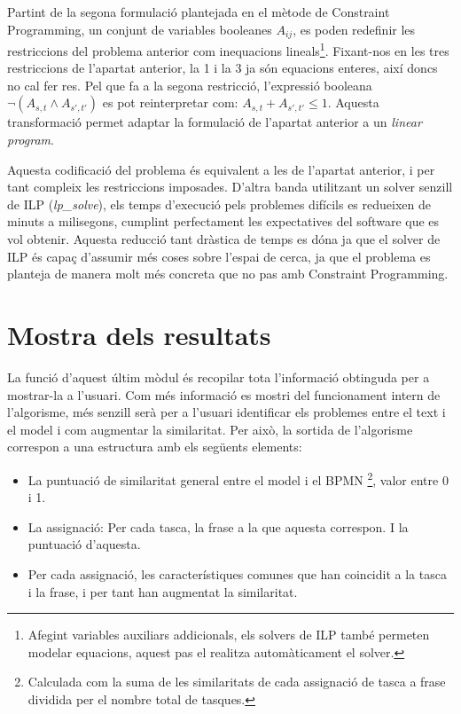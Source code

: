 Partint de la segona formulació plantejada en el mètode de Constraint Programming, un conjunt de variables booleanes $A_{ij}$, es poden redefinir les restriccions del problema anterior com inequacions lineals\footnote{Afegint variables auxiliars addicionals, els solvers de ILP també permeten modelar equacions, aquest pas el realitza automàticament el solver.}. Fixant-nos en les tres restriccions de l'apartat anterior, la 1 i la 3 ja són equacions enteres, així doncs no cal fer res. Pel que fa a la segona restricció, l'expressió booleana $\lnot (A_{s,t} \land A_{s',t'})$ es pot reinterpretar com: $A_{s,t} + A_{s',t'} \leq 1$. Aquesta transformació permet adaptar la formulació de l'apartat anterior a un \emph{linear program}.

Aquesta codificació del problema és equivalent a les de l'apartat anterior, i per tant compleix les restriccions imposades. D'altra banda utilitzant un solver senzill de ILP (\emph{lp\_solve}), els temps d'execució pels problemes difícils es redueixen de minuts a milisegons, cumplint perfectament les expectatives del software que es vol obtenir. Aquesta reducció tant dràstica de temps es dóna ja que el solver de ILP és capaç d'assumir més coses sobre l'espai de cerca, ja que el problema es planteja de manera molt més concreta que no pas amb Constraint Programming.

\section{Mostra dels resultats}
\label{sec:implementacio-resultats}

La funció d'aquest últim mòdul és recopilar tota l'informació obtinguda per a mostrar-la a l'usuari. Com més informació es mostri del funcionament intern de l'algorisme, més senzill serà per a l'usuari identificar els problemes entre el text i el model i com augmentar la similaritat. Per això, la sortida de l'algorisme correspon a una estructura amb els següents elements:

\begin{itemize}
    \item La puntuació de similaritat general entre el model i el BPMN \footnote{Calculada com la suma de les similaritats de cada assignació de tasca a frase dividida per el nombre total de tasques.}, valor entre 0 i 1.
    \item La assignació: Per cada tasca, la frase a la que aquesta correspon. I la puntuació d'aquesta.
    \item Per cada assignació, les característiques comunes que han coincidit a la tasca i la frase, i per tant han augmentat la similaritat.
\end{itemize}

